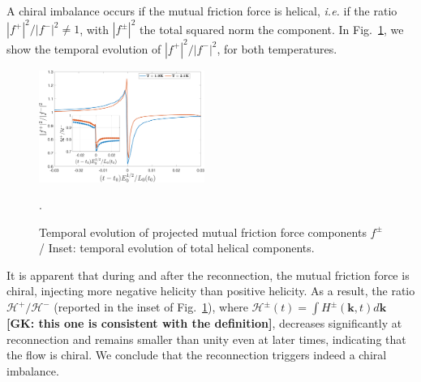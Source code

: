 \documentclass[%
 reprint,
 amsmath,amssymb,
 aps,
 prl,
]{revtex4-2}
\def \k{\mathbf{k}}
\newcommand*{\NOTE}[1]{\textbf{\color{red}[#1]}}
\begin{document}
A chiral imbalance occurs if the mutual friction force is helical, 
\textit{i.e.} if the ratio $|f^+|^2/|f^-|^2 \neq 1$, with $|f^\pm|^2$ the total squared norm the component. 
In Fig.~\ref{fig:mutual-friction-decomp}, we show the temporal evolution of $|f^+|^2/|f^-|^2$, for both temperatures. 
%
\begin{figure}[b]
    \centering
    \includegraphics*[width=0.48\textwidth]{fmfDecompFig.pdf}
    \caption{Temporal evolution of projected mutual friction force components $f^\pm$/ Inset: temporal evolution of total helical components.}.
    \label{fig:mutual-friction-decomp}
\end{figure}
%
It is apparent
that during and after the reconnection, the mutual friction force is chiral,
injecting more negative helicity than positive helicity. 
As a result, the ratio $\mathcal{H}^+/\mathcal{H}^-$ 
(reported in the inset of Fig.~\ref{fig:mutual-friction-decomp}), 
where $\mathcal{H}^\pm (t) = \int\!\!H^\pm(\k,t)d\k$ \NOTE{GK: this one is consistent with the definition}, 
decreases significantly at reconnection and remains smaller than unity even at later times, 
indicating that the flow is chiral. We conclude that the reconnection triggers indeed a chiral imbalance.


  
\end{document}
